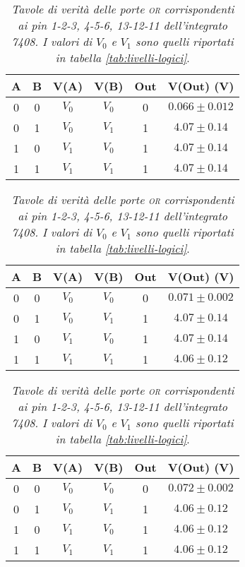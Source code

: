 \begin{table}[H]
  \centering
  \begin{tabular}[t]{c  c | c  c | c  c}
    \hline
    A & B & V(A) & V(B) & Out & V(Out) (V)\\
    \hline
    0 & 0 & $V_{0}$ & $V_{0}$ & 0 & $0.066 \pm 0.012$ \\
    0 & 1 & $V_{0}$ & $V_{1}$ & 1 & $4.07 \pm 0.14$ \\
    1 & 0 & $V_{1}$ & $V_{0}$ & 1 & $4.07 \pm 0.14$ \\
    1 & 1 & $V_{1}$ & $V_{1}$ & 1 & $4.07 \pm 0.14$ \\
    \hline
  \end{tabular}
  \vspace{.5mm}
  \begin{tabular}[t]{c  c | c  c | c  c}
    \hline
    A & B & V(A) & V(B) & Out & V(Out) (V)\\
    \hline
    0 & 0 & $V_{0}$ & $V_{0}$ & 0 & $0.071 \pm 0.002$ \\
    0 & 1 & $V_{0}$ & $V_{1}$ & 1 & $4.07 \pm 0.14$ \\
    1 & 0 & $V_{1}$ & $V_{0}$ & 1 & $4.07 \pm 0.14$ \\
    1 & 1 & $V_{1}$ & $V_{1}$ & 1 & $4.06 \pm 0.12$ \\
    \hline
  \end{tabular}
  \vspace{.5mm}
  \begin{tabular}[t]{c  c | c  c | c  c}
    \hline
    A & B & V(A) & V(B) & Out & V(Out) (V)\\
    \hline
    0 & 0 & $V_{0}$ & $V_{0}$ & 0 & $0.072 \pm 0.002$ \\
    0 & 1 & $V_{0}$ & $V_{1}$ & 1 & $4.06 \pm 0.12$ \\
    1 & 0 & $V_{1}$ & $V_{0}$ & 1 & $4.06 \pm 0.12$ \\
    1 & 1 & $V_{1}$ & $V_{1}$ & 1 & $4.06 \pm 0.12$ \\
    \hline
  \end{tabular}
  \caption{\emph{Tavole di verità delle porte \textsc{or} corrispondenti ai pin 1-2-3, 4-5-6, 13-12-11 dell'integrato 7408. I valori di $V_{0}$ e $V_{1}$ sono quelli riportati in tabella \ref{tab:livelli-logici}}.}
  \label{tab:or-multiplexer}
\end{table}

